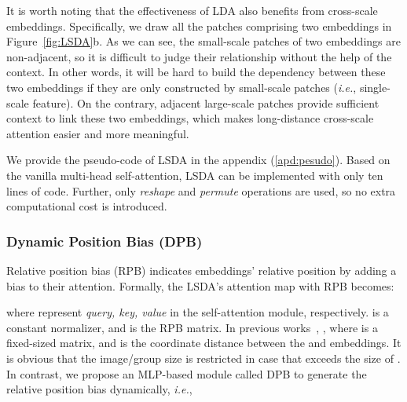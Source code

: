 \documentclass{article} \usepackage{iclr2022_conference,times}
\newcommand{\ie}{{\emph{i.e.}}}
\begin{document}
It is worth noting that the effectiveness of LDA also benefits from cross-scale embeddings. Specifically,
we draw all the patches comprising two embeddings in Figure~\ref{fig:LSDA}b.
As we can see,
the small-scale patches of two embeddings are non-adjacent, so it is difficult to judge their relationship without the help of the context.
In other words, it will be hard to build the dependency between these two embeddings if they are only constructed by small-scale patches (\ie, single-scale feature). On the contrary, adjacent large-scale patches provide sufficient context to link these two embeddings, which makes long-distance cross-scale attention easier and more meaningful.

We provide the pseudo-code of LSDA in the appendix (\ref{apd:pesudo}). Based on the vanilla multi-head self-attention, LSDA can be implemented with only ten lines of code. Further, only \textit{reshape} and \textit{permute} operations are used, so no extra computational cost is introduced.

\vspace{-2mm}
\subsubsection{Dynamic Position Bias (DPB)} \label{sec:dpb}
\vspace{-1mm}

Relative position bias (RPB) indicates embeddings' relative position by adding a bias to their attention. Formally, the LSDA's attention map with RPB becomes:

where  represent \textit{query, key, value} in the self-attention module, respectively.  is a constant normalizer, and  is the RPB matrix. In previous works~\citep{DBLP:journals/corr/abs-2103-14030}, , where  is a fixed-sized matrix, and  is the coordinate distance between the  and  embeddings. It is obvious that the image/group size is restricted in case that  exceeds the size of . In contrast, we propose an MLP-based module called DPB to generate the relative position bias dynamically, \ie,
\end{document}

